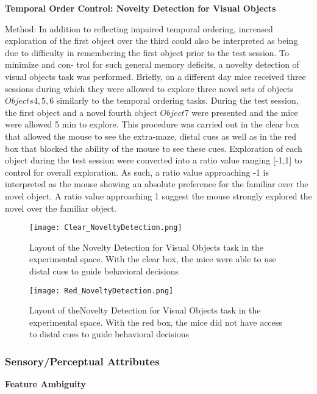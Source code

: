 \documentclass{article}
\begin{document}
\textbf{Temporal Order Control: Novelty Detection for Visual Objects}

Method:
In addition to reflecting impaired temporal ordering, increased exploration of the first object over the third could also be interpreted as being due to difficulty in remembering the first object prior to the test session. To minimize and con- trol for such general memory deficits, a novelty detection of visual objects task was performed. Briefly, on a different day mice received three sessions during which they were allowed to explore three novel sets of objects \(Objects 4, 5, 6\) similarly to the temporal ordering tasks. During the test session, the first object and a novel fourth object \(Object 7\) were presented and the mice were allowed 5 min to explore. This procedure was carried out in the clear box that allowed the mouse to see the extra-maze, distal cues as well as in the red box that blocked the ability of the mouse to see these cues. Exploration of each object during the test session were converted into a ratio value ranging [-1,1] to control for overall exploration. As such, a ratio value approaching -1 is interpreted as the mouse showing an absolute preference for the familiar over the novel object. A ratio value approaching 1 suggest the mouse strongly explored the novel over the familiar object.

\begin{figure}[h!]
\centering
\texttt{[image: Clear\_NoveltyDetection.png]}
\caption{Layout of the Novelty Detection for Visual Objects task in the experimental space. With the clear box, the mice were able to use distal cues to guide behavioral decisions}
\label{fig:Novelty Detection}
\end{figure}

\begin{figure}[h!]
\centering
\texttt{[image: Red\_NoveltyDetection.png]}
\caption{Layout of theNovelty Detection for Visual Objects task in the experimental space. With the red box, the mice did not have access to distal cues to guide behavioral decisions}
\label{fig:Novelty Detection}
\end{figure}

\subsubsection{Sensory/Perceptual Attributes}
\textbf{Feature Ambiguity}
\end{document}
